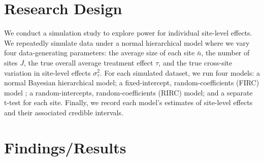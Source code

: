 \documentclass[]{article}
\begin{document}

\section{Research Design}

We conduct a simulation study to explore power for individual site-level effects.
We repeatedly simulate data under a normal hierarchical model where we vary four data-generating parameters: the average size of each site $\bar{n}$, the number of sites $J$, the true overall average treatment effect $\tau$, and the true cross-site variation in site-level effects $\sigma^2_\tau$.
For each simulated dataset, we run four models: a normal Bayesian hierarchical model; a fixed-intercept, random-coefficients (FIRC) model \citep{bloom2017using}; a random-intercepts, random-coefficients (RIRC) model; and a separate t-test for each site. 
Finally, we record each model’s estimates of site-level effects and their associated credible intervals.

\section{Findings/Results}

\end{document}

